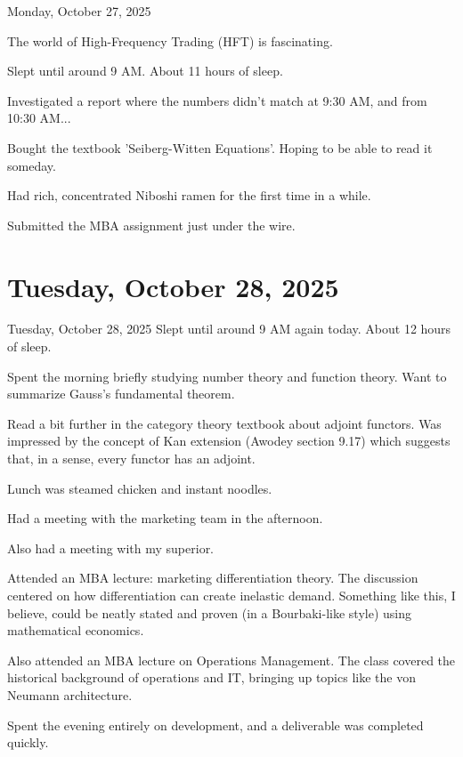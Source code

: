 \documentclass[dvipdfmx, autodetect-engine, aspectratio=169, 10.5pt]{beamer}
\begin{document}
\begin{frame}{Monday, October 27, 2025}

	The world of High-Frequency Trading (HFT) is fascinating.

	Slept until around 9 AM.
	About 11 hours of sleep.

	Investigated a report where the numbers didn't match at 9:30 AM, and from 10:30 AM...

	Bought the textbook 'Seiberg-Witten Equations'.
	Hoping to be able to read it someday.

	Had rich, concentrated Niboshi ramen for the first time in a while.

	Submitted the MBA assignment just under the wire.
\end{frame}

\section{Tuesday, October 28, 2025}
\begin{frame}{Tuesday, October 28, 2025}
	\scriptsize
	Slept until around 9 AM again today.
	About 12 hours of sleep.

	Spent the morning briefly studying number theory and function theory.
	Want to summarize Gauss's fundamental theorem.

	Read a bit further in the category theory textbook about adjoint functors.
	Was impressed by the concept of Kan extension (Awodey section 9.17) which suggests that, in a sense, every functor has an adjoint.

	Lunch was steamed chicken and instant noodles.

	Had a meeting with the marketing team in the afternoon.

	Also had a meeting with my superior.

	Attended an MBA lecture: marketing differentiation theory.
	The discussion centered on how differentiation can create inelastic demand.
	Something like this, I believe, could be neatly stated and proven (in a Bourbaki-like style) using mathematical economics.

	Also attended an MBA lecture on Operations Management.
	The class covered the historical background of operations and IT, bringing up topics like the von Neumann architecture.

	Spent the evening entirely on development, and a deliverable was completed quickly.
\end{frame}
\end{document}
